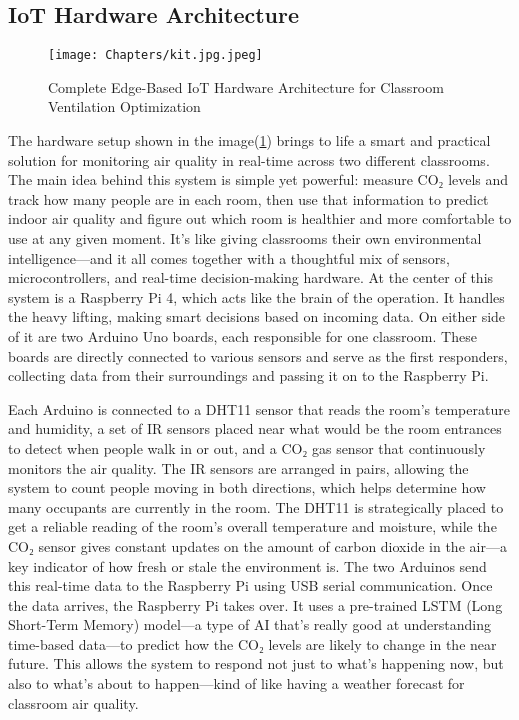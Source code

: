 \subsection{IoT Hardware Architecture}
\begin{figure}[h]
    \centering
    \texttt{[image: Chapters/kit.jpg.jpeg]}
    \caption{Complete Edge-Based IoT Hardware Architecture for Classroom Ventilation Optimization}
    \label{fig:augmentation}
\end{figure}

The hardware setup shown in the image(\ref{fig:augmentation}) brings to life a smart and practical solution for monitoring air quality in real-time across two different classrooms. The main idea behind this system is simple yet powerful: measure CO₂ levels and track how many people are in each room, then use that information to predict indoor air quality and figure out which room is healthier and more comfortable to use at any given moment. It’s like giving classrooms their own environmental intelligence—and it all comes together with a thoughtful mix of sensors, microcontrollers, and real-time decision-making hardware. At the center of this system is a Raspberry Pi 4, which acts like the brain of the operation. It handles the heavy lifting, making smart decisions based on incoming data. On either side of it are two Arduino Uno boards, each responsible for one classroom. These boards are directly connected to various sensors and serve as the first responders, collecting data from their surroundings and passing it on to the Raspberry Pi.

Each Arduino is connected to a DHT11 sensor that reads the room’s temperature and humidity, a set of IR sensors placed near what would be the room entrances to detect when people walk in or out, and a CO₂ gas sensor that continuously monitors the air quality. The IR sensors are arranged in pairs, allowing the system to count people moving in both directions, which helps determine how many occupants are currently in the room. The DHT11 is strategically placed to get a reliable reading of the room’s overall temperature and moisture, while the CO₂ sensor gives constant updates on the amount of carbon dioxide in the air—a key indicator of how fresh or stale the environment is. The two Arduinos send this real-time data to the Raspberry Pi using USB serial communication. Once the data arrives, the Raspberry Pi takes over. It uses a pre-trained LSTM (Long Short-Term Memory) model—a type of AI that’s really good at understanding time-based data—to predict how the CO₂ levels are likely to change in the near future. This allows the system to respond not just to what’s happening now, but also to what’s about to happen—kind of like having a weather forecast for classroom air quality.

